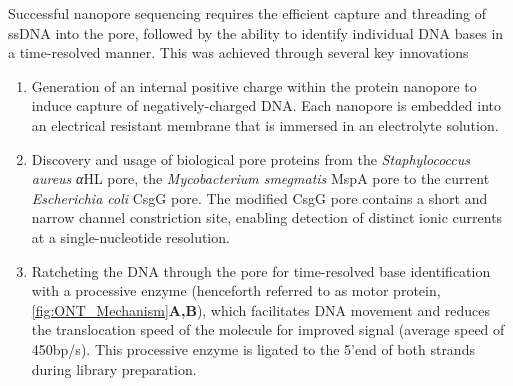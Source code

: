 Successful nanopore sequencing requires the efficient capture and threading of ssDNA into the pore, followed by the ability to identify individual DNA bases in a time-resolved manner. This was achieved through several key innovations\cite{Bayley2015} 
\begin{enumerate}
	\item Generation of an internal positive charge within the protein nanopore to induce capture of negatively-charged DNA. Each nanopore is embedded into an electrical resistant membrane that is immersed in an electrolyte solution.
	\item Discovery and usage of biological pore proteins from the \textit{Staphylococcus aureus} \textit{α}HL\cite{N2005} pore, the \textit{Mycobacterium smegmatis} MspA pore\cite{Manrao2011} to the current \textit{Escherichia coli} CsgG pore. The modified CsgG pore contains a short and narrow channel constriction site, enabling detection of distinct ionic currents at a single-nucleotide resolution. 
	\item Ratcheting the DNA through the pore for time-resolved base identification with a processive enzyme (henceforth referred to as motor protein, \cref{fig:ONT_Mechanism}\textbf{A,B}), which facilitates DNA movement and reduces the translocation speed of the molecule for improved signal (average speed of 450bp/s)\cite{Rang2018}. This processive enzyme is ligated to the 5'end of both strands during library preparation.   
\end{enumerate}

